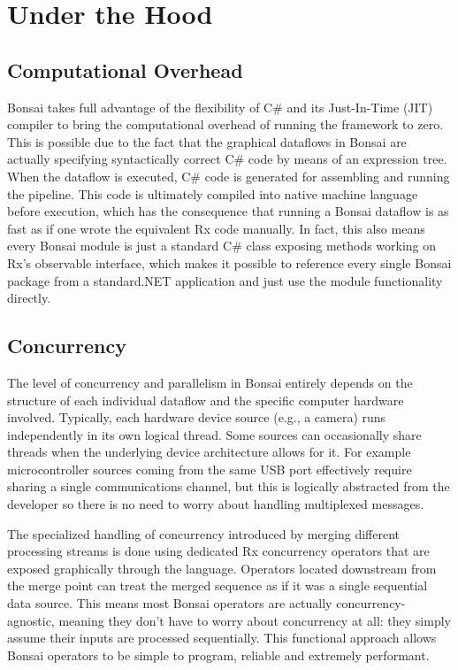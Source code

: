 \section{Under the Hood}

\subsection{Computational Overhead}

Bonsai takes full advantage of the flexibility of C\# and its Just-In-Time (JIT) compiler to bring the computational overhead of running the framework to zero. This is possible due to the fact that the graphical dataflows in Bonsai are actually specifying syntactically correct C\# code by means of an expression tree. When the dataflow is executed, C\# code is generated for assembling and running the pipeline. This code is ultimately compiled into native machine language before execution, which has the consequence that running a Bonsai dataflow is as fast as if one wrote the equivalent Rx code manually. In fact, this also means every Bonsai module is just a standard C\# class exposing methods working on Rx's observable interface, which makes it possible to reference every single Bonsai package from a standard.NET application and just use the module functionality directly.

\subsection{Concurrency}

The level of concurrency and parallelism in Bonsai entirely depends on the structure of each individual dataflow and the specific computer hardware involved. Typically, each hardware device source (e.g., a camera) runs independently in its own logical thread. Some sources can occasionally share threads when the underlying device architecture allows for it. For example microcontroller sources coming from the same USB port effectively require sharing a single communications channel, but this is logically abstracted from the developer so there is no need to worry about handling multiplexed messages.

The specialized handling of concurrency introduced by merging different processing streams is done using dedicated Rx concurrency operators that are exposed graphically through the language. Operators located downstream from the merge point can treat the merged sequence as if it was a single sequential data source. This means most Bonsai operators are actually concurrency-agnostic, meaning they don't have to worry about concurrency at all: they simply assume their inputs are processed sequentially. This functional approach allows Bonsai operators to be simple to program, reliable and extremely performant.

